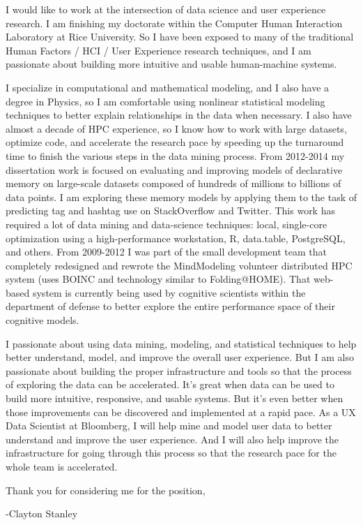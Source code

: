\documentclass{article}
\begin{document}
I would like to work at the intersection of data science and user experience research.
I am finishing my doctorate within the Computer Human Interaction Laboratory at Rice University.
So I have been exposed to many of the traditional Human Factors / HCI / User Experience research techniques, and I am passionate about building more intuitive and usable human-machine systems.

I specialize in computational and mathematical modeling, and I also have a degree in Physics, so I am comfortable using nonlinear statistical modeling techniques to better explain relationships in the data when necessary.
I also have almost a decade of HPC experience, so I know how to work with large datasets, optimize code,
and accelerate the research pace by speeding up the turnaround time to finish the various steps in the data mining process. 
From 2012-2014 my dissertation work is focused on evaluating and improving models of declarative memory on large-scale datasets composed of hundreds of millions to billions of data points.
I am exploring these memory models by applying them to the task of predicting tag and hashtag use on StackOverflow and Twitter.
This work has required a lot of data mining and data-science techniques: local, single-core optimization using a high-performance workstation, R, data.table, PostgreSQL, and others.
From 2009-2012 I was part of the small development team that completely redesigned and rewrote the MindModeling volunteer distributed HPC system (uses BOINC and technology similar to Folding@HOME).
That web-based system is currently being used by cognitive scientists within the department of defense to better explore the entire performance space of their cognitive models.

I passionate about using data mining, modeling, and statistical techniques to help better understand, model, and improve the overall user experience. 
But I am also passionate about building the proper infrastructure and tools so that the process of exploring the data can be accelerated.
It's great when data can be used to build more intuitive, responsive, and usable systems.
But it's even better when those improvements can be discovered and implemented at a rapid pace.
As a UX Data Scientist at Bloomberg, I will help mine and model user data to better understand and improve the user experience.
And I will also help improve the infrastructure for going through this process so that the research pace for the whole team is accelerated.

Thank you for considering me for the position,

-Clayton Stanley
\end{document}
